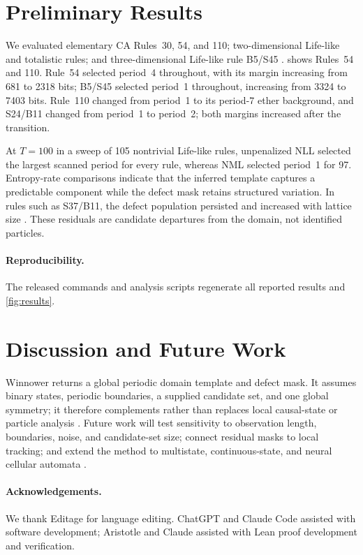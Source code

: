 \documentclass[letterpaper]{article}
\begin{document}
\section{Preliminary Results}
We evaluated elementary CA Rules~30, 54, and 110; two-dimensional Life-like and
totalistic rules; and three-dimensional Life-like rule B5/S45
\citep{bays1987,bays2006}.  shows Rules~54 and 110. Rule~54
selected period~4 throughout, with its margin increasing from 681 to 2318 bits;
B5/S45 selected period~1 throughout, increasing from 3324 to 7403 bits.
Rule~110 changed from period~1 to its period-7 ether background, and S24/B11
changed from period~1 to period~2; both margins increased after the transition.

At $T{=}100$ in a sweep of 105 nontrivial Life-like rules, unpenalized NLL
selected the largest scanned period for every rule, whereas NML selected
period~1 for 97. Entropy-rate comparisons indicate that the inferred template
captures a predictable component while the defect mask retains structured
variation. In rules such as S37/B11, the defect population persisted and
increased with lattice size \citep{secktuohmora2023}. These residuals are
candidate departures from the domain, not identified particles.

\paragraph{Reproducibility.} The released commands and analysis scripts
regenerate all reported results and \cref{fig:results}.

\section{Discussion and Future Work}
Winnower returns a global periodic domain template and defect mask. It assumes
binary states, periodic boundaries, a supplied candidate set, and one global
symmetry; it therefore complements rather than replaces local causal-state or
particle analysis \citep{rupe2024,rupe2025}. Future work will test sensitivity
to observation length, boundaries, noise, and candidate-set size; connect
residual masks to local tracking; and extend the method to multistate,
continuous-state, and neural cellular automata
\citep{hamon2024,plantec2025,niklasson2021}.

\paragraph{Acknowledgements.} We thank Editage for language editing. ChatGPT
and Claude Code assisted with software development; Aristotle and Claude
assisted with Lean proof development and verification.
\end{document}

